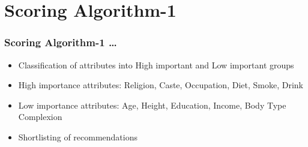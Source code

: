 \documentclass[10pt, compress]{beamer}
\begin{document}
\section{Scoring Algorithm-1}

\begin{frame}[fragile]
  \frametitle{Scoring Algorithm-1 \ldots}
  \begin{itemize}
  \item<1> Classification of attributes into High important and Low important groups
  \item<1> High importance attributes: \alert{Religion, Caste, Occupation, Diet, Smoke, Drink}
  \item<1> Low importance attributes: \alert{Age, Height, Education, Income, Body Type Complexion}
  \item<1> Shortlisting of recommendations
  
 \end{itemize}
\end{frame}
\end{document}
